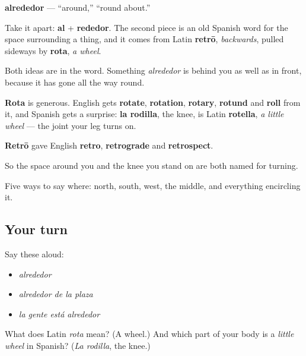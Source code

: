 \begin{cousinweb}
\textbf{alrededor} — \textquotedblleft{}around,\textquotedblright{} \textquotedblleft{}round about.\textquotedblright{}

Take it apart: \textbf{al} + \textbf{rededor}. The second piece is an old Spanish word for the space surrounding a thing, and it comes from Latin \textbf{retrō}, \emph{backwards}, pulled sideways by \textbf{rota}, \emph{a wheel}.

Both ideas are in the word. Something \emph{alrededor} is behind you as well as in front, because it has gone all the way round.

\textbf{Rota} is generous. English gets \textbf{rotate}, \textbf{rotation}, \textbf{rotary}, \textbf{rotund} and \textbf{roll} from it, and Spanish gets a surprise: \textbf{la rodilla}, the knee, is Latin \textbf{rotella}, \emph{a little wheel} — the joint your leg turns on.

\textbf{Retrō} gave English \textbf{retro}, \textbf{retrograde} and \textbf{retrospect}.

So the space around you and the knee you stand on are both named for turning.
\end{cousinweb}

\begin{grammarlens}[title={What you've built}]
Five ways to say where: north, south, west, the middle, and everything encircling it.
\end{grammarlens}

\subsection*{Your turn}
Say these aloud:

\begin{itemize}
\raggedright
  \item \emph{alrededor}
  \item \emph{alrededor de la plaza}
  \item \emph{la gente está alrededor}
\end{itemize}

\begin{tcolorbox}[breakable,colback=teal!4,colframe=teal!35!black,title={Before you move on}]
What does Latin \emph{rota} mean? (A wheel.) And which part of your body is a \emph{little wheel} in Spanish? (\emph{La rodilla}, the knee.)
\end{tcolorbox}
